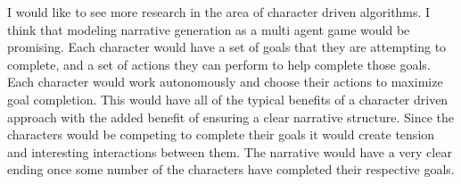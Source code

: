 \documentclass[]{article}
\begin{document}
I would like to see more research in the area of character driven algorithms. I think that modeling narrative generation as a multi agent game would be promising. Each character would have a set of goals that they are attempting to complete, and a set of actions they can perform to help complete those goals. Each character would work autonomously and choose their actions to maximize goal completion. This would have all of the typical benefits of a character driven approach with the added benefit of ensuring a clear narrative structure. Since the characters would be competing to complete their goals it would create tension and interesting interactions between them. The narrative would have a very clear ending once some number of the characters have completed their respective goals.


\end{document}
